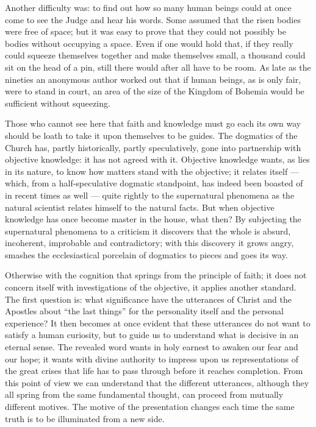 \documentclass[12pt,a4paper,openany]{book}
\newcommand{\opage}[1]{\marginnote{\footnotesize\textit{[#1]}}}
\begin{document}
Another difficulty was: to find out how so many human beings could at once come to see the Judge and hear his words.
Some assumed that the risen bodies were free of space; but it was easy to prove that they could not possibly be bodies
without occupying a space. Even if one would hold that, if they really could squeeze themselves together and make
themselves small, a thousand could sit on the head of a pin, still there would after all have to be room. As late as
the nineties an anonymous author worked out that if human beings, as is only fair, were to stand in court, an area of
the size of the Kingdom of Bohemia would be sufficient without squeezing.

Those who cannot see here that faith and knowledge must go each its own way should be loath to take it upon themselves
to be guides. The dogmatics of the Church has, partly historically, partly speculatively, gone into partnership with
objective knowledge: it has not agreed with it. Objective knowledge wants, as lies in its nature, to know how matters
stand
\setcounter{footnote}{0}%
\opage{90}with the objective; it relates itself --- which, from a half-speculative dogmatic standpoint, has indeed
been boasted of in recent times as well --- quite rightly to the supernatural phenomena as the natural scientist
relates himself to the natural facts. But when objective knowledge has once become master in the house, what then? By
subjecting the supernatural phenomena to a criticism it discovers that the whole is absurd, incoherent, improbable and
contradictory; with this discovery it grows angry, smashes the ecclesiastical porcelain of dogmatics to pieces and
goes its way.

Otherwise with the cognition that springs from the principle of faith; it does not concern itself with investigations
of the objective, it applies another standard. The first question is: what significance have the utterances of
Christ and the Apostles about ``the last things'' for the personality itself and the personal experience? It then
becomes at once evident that these utterances do not want to satisfy a human curiosity, but to guide us to understand
what is decisive in an eternal sense. The revealed word wants in holy earnest to awaken our fear and our hope; it wants
with divine authority to impress upon us representations of the great crises that life has to pass through before it
reaches completion. From this point of view we can understand that the different utterances, although they all spring
from the same fundamental thought, can proceed from mutually different motives. The motive of the presentation
changes each time the same truth is to be illuminated from a new side.
\end{document}
